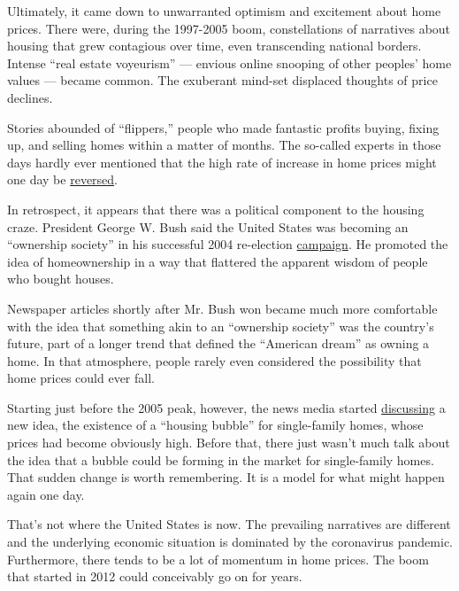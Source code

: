 Ultimately, it came down to unwarranted optimism and excitement about
home prices. There were, during the 1997-2005 boom, constellations of
narratives about housing that grew contagious over time, even
transcending national borders. Intense ``real estate voyeurism'' ---
envious online snooping of other peoples' home values --- became common.
The exuberant mind-set displaced thoughts of price declines.

Stories abounded of ``flippers,'' people who made fantastic profits
buying, fixing up, and selling homes within a matter of months. The
so-called experts in those days hardly ever mentioned that the high rate
of increase in home prices might one day be
\href{https://www.attomdata.com/news/market-trends/flipping/attom-data-solutions-q2-2019-u-s-home-flipping-report/}{reversed}.

In retrospect, it appears that there was a political component to the
housing craze. President George W. Bush said the United States was
becoming an ``ownership society'' in his successful 2004 re-election
\href{https://www.nytimes3xbfgragh.onion/2003/02/23/weekinreview/the-nation-focus-groups-to-bush-the-crowd-was-a-blur.html?searchResultPosition=1}{campaign}.
He promoted the idea of homeownership in a way that flattered the
apparent wisdom of people who bought houses.

Newspaper articles shortly after Mr. Bush won became much more
comfortable with the idea that something akin to an ``ownership
society'' was the country's future, part of a longer trend that defined
the ``American dream'' as owning a home. In that atmosphere, people
rarely even considered the possibility that home prices could ever fall.

Starting just before the 2005 peak, however, the news media started
\href{https://www.chicagotribune.com/news/ct-xpm-2004-09-19-0409190429-story.html}{discussing}
a new idea, the existence of a ``housing bubble'' for single-family
homes, whose prices had become obviously high. Before that, there just
wasn't much talk about the idea that a bubble could be forming in the
market for single-family homes. That sudden change is worth remembering.
It is a model for what might happen again one day.

That's not where the United States is now. The prevailing narratives are
different and the underlying economic situation is dominated by the
coronavirus pandemic. Furthermore, there tends to be a lot of momentum
in home prices. The boom that started in 2012 could conceivably go on
for years.

